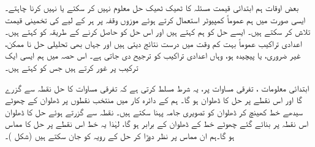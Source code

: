 

بعض اوقات ہم ابتدائی قیمت مسئلہ  کا  ٹھیک ٹھیک  حل معلوم نہیں کر سکتے  یا نہیں کرنا چاہتے۔ ایسی صورت میں ہم عموماً کمپیوٹر استعمال کرتے ہوئے موزوں وقفہ پر ہر  کے لیے  کی تخمینی قیمت   تلاش کر سکتے ہیں۔ ایسے حل کو ہم  کہتے ہیں اور اس حل کو حاصل کرنے کے طریقہ کو  کہتے ہیں۔ اعدادی تراکیب عموماً بہت کم وقت میں  درست نتائج  دیتی ہیں اور جہاں بھی تحلیلی حل نا ممکن، غیر ضروری،  یا پیچیدہ ہو، وہاں اعدادی تراکیب کو ترجیح دی جاتی ہے۔ اس حصہ میں ہم ایسی  ایک ترکیب پر غور کرتے ہیں جس کو  کہتے ہیں۔ 

ابتدائی معلومات ،  تفرقی مساوات  پر،  یہ شرط مسلط کرتی ہے کہ تفرقی مساوات کا حل نقطہ   سے گزرے گا اور اس نقطے پر حل کا ڈھلوان  ہو گا۔ ہم  کے دائرہ کار میں منتخب نقطوں  پر ڈھلوان   کے  چھوٹے  سیدھے خط کھینچ  کر   ڈھلوان کو تصویری جامہ پہنا سکتے ہیں۔ نقطہ  سے گزرتے ہوئے حل کا  ڈھلوان اس نقطہ پر بنائے گئے  چھوٹے خط کے ڈھلوان کے برابر ہو گا، لہٰذا یہ خط اس نقطے پر حل کا مماس ہو گا۔ہم ان مماس پر نظر دوڑا کر حل کے رویہ کو جان سکتے ہیں (شکل )۔

